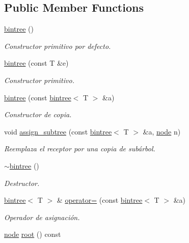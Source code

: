 \subsection*{Public Member Functions}
\begin{DoxyCompactItemize}
\item 
\hyperlink{classbintree_a9fed4a26a9c177dfa14a9cb573b43dca}{bintree} ()
\begin{DoxyCompactList}\small\item\em Constructor primitivo por defecto. \end{DoxyCompactList}\item 
\hyperlink{classbintree_a21aaa03b1510c5ffa52236d2a8973273}{bintree} (const T \&e)
\begin{DoxyCompactList}\small\item\em Constructor primitivo. \end{DoxyCompactList}\item 
\hyperlink{classbintree_a4658c6df869d8b35a72b6cbcf410bc5f}{bintree} (const \hyperlink{classbintree}{bintree}$<$ T $>$ \&a)
\begin{DoxyCompactList}\small\item\em Constructor de copia. \end{DoxyCompactList}\item 
void \hyperlink{classbintree_ab5fb2e54f418de017ba23a2b7084e67e}{assign\+\_\+subtree} (const \hyperlink{classbintree}{bintree}$<$ T $>$ \&a, \hyperlink{classbintree_1_1node}{node} n)
\begin{DoxyCompactList}\small\item\em Reemplaza el receptor por una copia de subárbol. \end{DoxyCompactList}\item 
\hyperlink{classbintree_a7f32fcbdc9aed453025a13cbe93e3b89}{$\sim$bintree} ()
\begin{DoxyCompactList}\small\item\em Destructor. \end{DoxyCompactList}\item 
\hyperlink{classbintree}{bintree}$<$ T $>$ \& \hyperlink{classbintree_a188622dd3846630d2f69b11a2eba3896}{operator=} (const \hyperlink{classbintree}{bintree}$<$ T $>$ \&a)
\begin{DoxyCompactList}\small\item\em Operador de asignación. \end{DoxyCompactList}\item 
\hyperlink{classbintree_1_1node}{node} \hyperlink{classbintree_aa5d9c32204880ba5df3b31836d8720da}{root} () const 

\end{DoxyCompactItemize}
